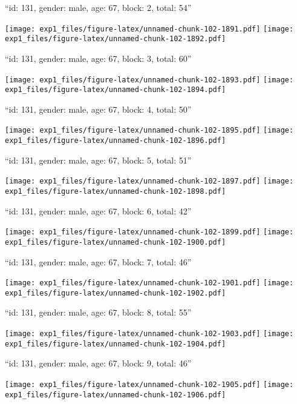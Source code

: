 \documentclass[11pt,,]{article}
\begin{document}
\newpage
[1] 

``id: 131, gender: male, age: 67, block: 2, total: 54''

\texttt{[image: exp1\_files/figure-latex/unnamed-chunk-102-1891.pdf]}
\texttt{[image: exp1\_files/figure-latex/unnamed-chunk-102-1892.pdf]}

\newpage
[1] 

``id: 131, gender: male, age: 67, block: 3, total: 60''

\texttt{[image: exp1\_files/figure-latex/unnamed-chunk-102-1893.pdf]}
\texttt{[image: exp1\_files/figure-latex/unnamed-chunk-102-1894.pdf]}

\newpage
[1] 

``id: 131, gender: male, age: 67, block: 4, total: 50''

\texttt{[image: exp1\_files/figure-latex/unnamed-chunk-102-1895.pdf]}
\texttt{[image: exp1\_files/figure-latex/unnamed-chunk-102-1896.pdf]}

\newpage
[1] 

``id: 131, gender: male, age: 67, block: 5, total: 51''

\texttt{[image: exp1\_files/figure-latex/unnamed-chunk-102-1897.pdf]}
\texttt{[image: exp1\_files/figure-latex/unnamed-chunk-102-1898.pdf]}

\newpage
[1] 

``id: 131, gender: male, age: 67, block: 6, total: 42''

\texttt{[image: exp1\_files/figure-latex/unnamed-chunk-102-1899.pdf]}
\texttt{[image: exp1\_files/figure-latex/unnamed-chunk-102-1900.pdf]}

\newpage
[1] 

``id: 131, gender: male, age: 67, block: 7, total: 46''

\texttt{[image: exp1\_files/figure-latex/unnamed-chunk-102-1901.pdf]}
\texttt{[image: exp1\_files/figure-latex/unnamed-chunk-102-1902.pdf]}

\newpage
[1] 

``id: 131, gender: male, age: 67, block: 8, total: 55''

\texttt{[image: exp1\_files/figure-latex/unnamed-chunk-102-1903.pdf]}
\texttt{[image: exp1\_files/figure-latex/unnamed-chunk-102-1904.pdf]}

\newpage
[1] 

``id: 131, gender: male, age: 67, block: 9, total: 46''

\texttt{[image: exp1\_files/figure-latex/unnamed-chunk-102-1905.pdf]}
\texttt{[image: exp1\_files/figure-latex/unnamed-chunk-102-1906.pdf]}
\end{document}
